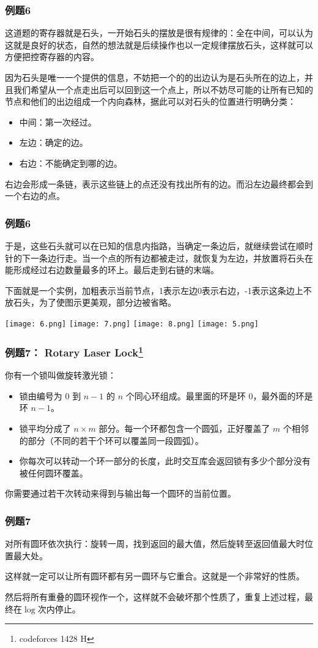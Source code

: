 \documentclass[10pt]{beamer}
\begin{document}
	\begin{frame}
		\frametitle{例题6}
		
		这道题的寄存器就是石头，一开始石头的摆放是很有规律的：全在中间，可以认为这就是良好的状态，自然的想法就是后续操作也以一定规律摆放石头，这样就可以方便把控寄存器的内容。
		
		因为石头是唯一一个提供的信息，不妨把一个的的出边认为是石头所在的边上，并且我们希望从一个点走出后可以回到这一个点上，所以不妨尽可能的让所有已知的节点和他们的出边组成一个内向森林，据此可以对石头的位置进行明确分类：
		
		\begin{itemize}
			\item 中间：第一次经过。
			\item 左边：确定的边。
			\item 右边：不能确定到哪的边。
		\end{itemize}
		
		右边会形成一条链，表示这些链上的点还没有找出所有的边。而沿左边最终都会到一个右边的点。
	\end{frame}
	\begin{frame}
		\frametitle{例题6}
		
			
		
		于是，这些石头就可以在已知的信息内指路，当确定一条边后，就继续尝试在顺时针的下一条边行走。当一个点的所有边都被走过，就恢复为左边，并放置将石头在能形成经过右边数量最多的环上。最后走到右链的末端。
		
		下面就是一个实例，加粗表示当前节点，1表示左边0表示右边，-1表示这条边上不放石头，为了使图示更美观，部分边被省略。

		\texttt{[image: 6.png]}
		\texttt{[image: 7.png]}
		\texttt{[image: 8.png]}
		\texttt{[image: 5.png]}
	
	\end{frame}
	\begin{frame}
		\frametitle{例题7： Rotary Laser Lock\footnote{codeforces 1428 H}}

		你有一个锁叫做旋转激光锁：
		
		\begin{itemize}
			\item 锁由编号为 $0$ 到 $n-1$ 的 $n$ 个同心环组成。最里面的环是环 $0$，最外面的环是环 $n-1$。
			\item 锁平均分成了 $n\times m$ 部分。每一个环都包含一个圆弧，正好覆盖了 $m$ 个相邻的部分（不同的若干个环可以覆盖同一段圆弧）。
			\item 你每次可以转动一个环一部分的长度，此时交互库会返回锁有多少个部分没有被任何圆环覆盖。
		\end{itemize}
		
		你需要通过若干次转动来得到与输出每一个圆环的当前位置。
		
		
	
	\end{frame}
	\begin{frame}
		\frametitle{例题7}
	
		对所有圆环依次执行：旋转一周，找到返回的最大值，然后旋转至返回值最大时位置最大处。

		这样就一定可以让所有圆环都有另一圆环与它重合。这就是一个非常好的性质。

		然后将所有重叠的圆环视作一个，这样就不会破坏那个性质了，重复上述过程，最终在$\log$次内停止。

	
	\end{frame}
\end{document}
